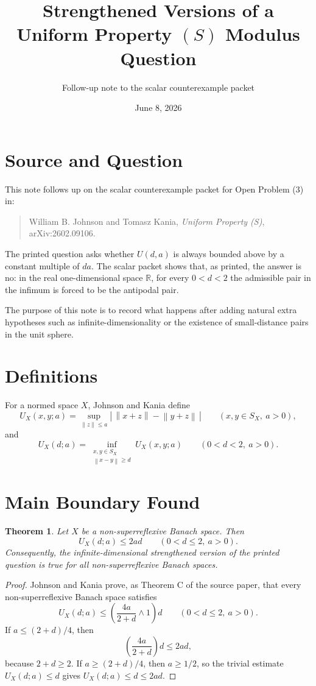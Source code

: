 \documentclass[11pt]{article}
\title{Strengthened Versions of a Uniform Property \texorpdfstring{$(S)$}{(S)} Modulus Question}
\author{Follow-up note to the scalar counterexample packet}
\date{June 8, 2026}
\newtheorem{theorem}{Theorem}
\newcommand{\norm}[1]{\left\lVert #1 \right\rVert}
\newcommand{\R}{\mathbb{R}}
\begin{document}
\maketitle

\section*{Source and Question}

This note follows up on the scalar counterexample packet for Open
Problem (3) in:
\begin{quote}
William B. Johnson and Tomasz Kania, \emph{Uniform Property (S)},
arXiv:2602.09106.
\end{quote}
The printed question asks whether \(U(d,a)\) is always bounded above by
a constant multiple of \(da\).  The scalar packet shows that, as printed,
the answer is no: in the real one-dimensional space \(\R\), for every
\(0<d<2\) the admissible pair in the infimum is forced to be the
antipodal pair.

The purpose of this note is to record what happens after adding natural
extra hypotheses such as infinite-dimensionality or the existence of
small-distance pairs in the unit sphere.

\section*{Definitions}

For a normed space \(X\), Johnson and Kania define
\[
  U_X(x,y;a)
  =
  \sup_{\norm{z}\le a}
  \left|\,\norm{x+z}-\norm{y+z}\,\right|
  \qquad (x,y\in S_X,\ a>0),
\]
and
\[
  U_X(d;a)
  =
  \inf_{\substack{x,y\in S_X\\ \norm{x-y}\ge d}}
  U_X(x,y;a)
  \qquad (0<d<2,\ a>0).
\]

\section*{Main Boundary Found}

\begin{theorem}
Let \(X\) be a non-superreflexive Banach space.  Then
\[
  U_X(d;a)\le 2ad
  \qquad (0<d\le 2,\ a>0).
\]
Consequently, the infinite-dimensional strengthened version of the
printed question is true for all non-superreflexive Banach spaces.
\end{theorem}

\begin{proof}
Johnson and Kania prove, as Theorem C of the source paper, that every
non-superreflexive Banach space satisfies
\[
  U_X(d;a)
  \le
  \left(\frac{4a}{2+d}\wedge 1\right)d
  \qquad (0<d\le 2,\ a>0).
\]
If \(a\le (2+d)/4\), then
\[
  \left(\frac{4a}{2+d}\right)d
  \le 2ad,
\]
because \(2+d\ge 2\).  If \(a\ge (2+d)/4\), then \(a\ge 1/2\), so the
trivial estimate \(U_X(d;a)\le d\) gives \(U_X(d;a)\le d\le 2ad\).
\end{proof}
\end{document}
